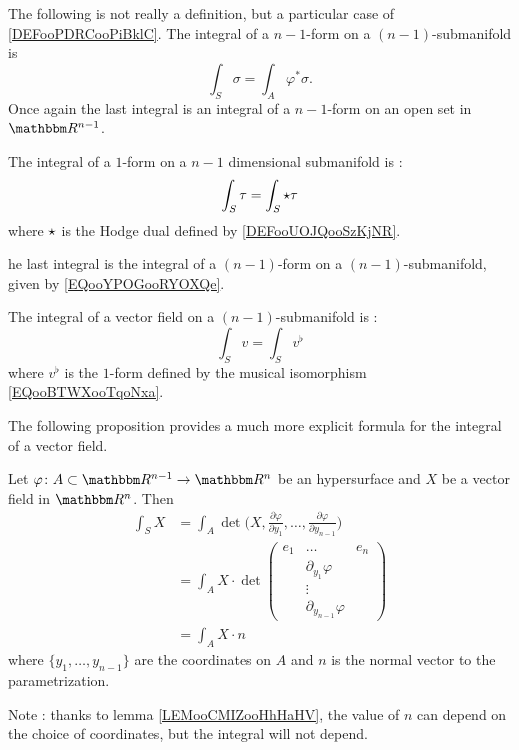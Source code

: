 The following is not really a definition, but a particular case of \ref{DEFooPDRCooPiBklC}. The integral of a \( n-1\)-form on a \( (n-1)\)-submanifold is
\begin{equation}        \label{EQooYPOGooRYOXQe}
    \int_S\sigma=\int_A\varphi^*\sigma.
\end{equation}
Once again the last integral is an integral of a \( n-1\)-form on an open set in \( \eR^{n-1}\).

\begin{definition}       \label{DEFooAXFXooWiMLKP}
    The integral of a \( 1\)-form on a \( n-1\) dimensional submanifold is :
    \begin{equation}
        \int_S\tau=\int_S\star\tau
    \end{equation}
    where \( \star\) is the Hodge dual defined by \ref{DEFooUOJQooSzKjNR}. 
\end{definition}
he last integral is the integral of a \( (n-1)\)-form on a \( (n-1)\)-submanifold, given by \eqref{EQooYPOGooRYOXQe}.

\begin{definition}      \label{DEFooAXZGooJairMQ}
    The integral of a vector field on a \( (n-1)\)-submanifold is :
    \begin{equation}
        \int_Sv=\int_Sv^{\flat}
    \end{equation}
    where \( v^{\flat}\) is the \( 1\)-form defined by the musical isomorphism \eqref{EQooBTWXooTqoNxa}.
\end{definition}

The following proposition provides a much more explicit formula for the integral of a vector field. 

\begin{proposition}     \label{PROPooETLZooAVsrwy}
    Let \( \varphi\colon A\subset \eR^{n-1}\to \eR^n\) be an hypersurface and \( X\) be a vector field in \( \eR^n\). Then
    \begin{subequations}
        \begin{align}
            \int_SX&=\int_A\det\big( X,\frac{ \partial \varphi }{ \partial y_1 },\ldots, \frac{ \partial \varphi }{ \partial y_{n-1} } \big)  \label{SUBEQooWJSPooImJjQN}\\
            &=\int_A X\cdot\det\begin{pmatrix}
                e_1    &   \ldots    &   e_n    \\
                &   \partial_{y_1}\varphi    &       \\
                &    \vdots   &       \\
                &   \partial_{y_{n-1}}\varphi    &   
            \end{pmatrix}\\
            &=\int_A X\cdot n
        \end{align}
    \end{subequations}
    where \( \{ y_1,\ldots, y_{n-1} \}\) are the coordinates on \( A\) and \( n\) is the normal vector to the parametrization.
\end{proposition}
Note : thanks to lemma \ref{LEMooCMIZooHhHaHV}, the value of \( n\) can depend on the choice of coordinates, but the integral will not depend.

